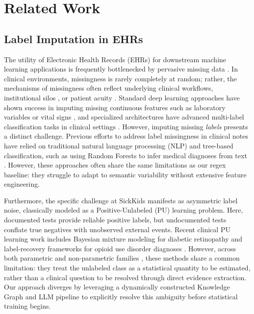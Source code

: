 \documentclass[pmlr]{jmlr}%
\begin{document}
\section{Related Work}
\subsection*{Label Imputation in EHRs}
The utility of Electronic Health Records (EHRs) for downstream machine learning applications is frequently bottlenecked by pervasive missing data \cite{sysreview_ehr_missing_2024}. In clinical environments, missingness is rarely completely at random; rather, the mechanisms of missingness often reflect underlying clinical workflows, institutional silos \cite{ross2020accuracy}, or patient acuity \cite{geisinger_missingness_2021}. Standard deep learning approaches have shown success in imputing missing continuous features such as laboratory variables or vital signs \cite{ieee_dl_imputation}, and specialized architectures have advanced multi-label classification tasks in clinical settings \cite{santos_corki_2024}. However, imputing missing \textit{labels} presents a distinct challenge. Previous efforts to address label missingness in clinical notes have relied on traditional natural language processing (NLP) and tree-based classification, such as using Random Forests to infer medical diagnoses from text \cite{yang_rf_imputation_2018}. However, these approaches often share the same limitations as our regex baseline: they struggle to adapt to semantic variability without extensive feature engineering.

Furthermore, the specific challenge at SickKids manifests as asymmetric label noise, classically modeled as a Positive-Unlabeled (PU) learning problem. Here, documented tests provide reliable positive labels, but undocumented tests conflate true negatives with unobserved external events. Recent clinical PU learning work includes Bayesian mixture modeling for diabetic retinopathy \cite{cerner_pu_2023} and label-recovery frameworks for opioid use disorder diagnoses \cite{pulsnar_oud_2025}. However, across both parametric and non-parametric families \cite{bekker2020learning}, these methods share a common limitation: they treat the unlabeled class as a statistical quantity to be estimated, rather than a clinical question to be resolved through direct evidence extraction. Our approach diverges by leveraging a dynamically constructed Knowledge Graph and LLM pipeline to explicitly resolve this ambiguity before statistical training begins.
\end{document}
